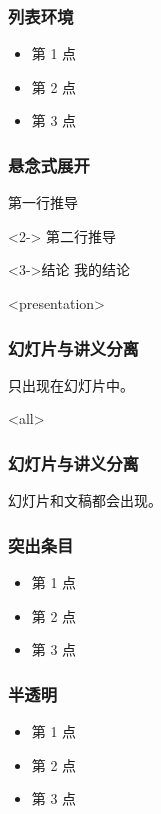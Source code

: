 \documentclass{beamer}
\begin{document}
\begin{CJK}{UTF8}{hei}
    \begin{frame}
        \frametitle{列表环境}
        \begin{itemize}[<+->]
            \item 第 1 点
            \item 第 2 点
            \item 第 3 点
        \end{itemize}
    \end{frame}

    \begin{frame}
        \frametitle{悬念式展开}
        第一行推导

        \begin{actionenv}<2->
            第二行推导
        \end{actionenv}

        \begin{block}<3->{结论}
            我的结论
        \end{block}
    \end{frame}

    \begin{frame}<presentation>
        \frametitle{幻灯片与讲义分离}
        只出现在幻灯片中。
    \end{frame}

    \begin{frame}<all>
        \frametitle{幻灯片与讲义分离}
        幻灯片和文稿都会出现。

    \end{frame}

    \begin{frame}
        \frametitle{突出条目}
        \begin{itemize}[<+-| alert@+>]
            \item 第 1 点
            \item 第 2 点
            \item 第 3 点
        \end{itemize}
    \end{frame}


    \begin{frame}
        \frametitle{半透明}
        \begin{itemize}[<+-| alert@+>]
            \item 第 1 点
            \item 第 2 点
            \item 第 3 点
        \end{itemize}
    \end{frame}


\end{CJK}
\end{document}
